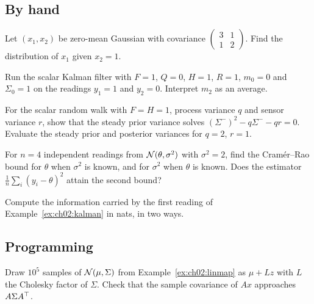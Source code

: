 \subsection*{By hand}

\begin{exercise}\label{exr:ch02:cond}
Let $(x_1,x_2)$ be zero-mean Gaussian with covariance
$\begin{pmatrix}3&1\\1&2\end{pmatrix}$. Find the distribution of $x_1$ given
$x_2=1$.
\end{exercise}

\begin{exercise}\label{exr:ch02:static}
Run the scalar Kalman filter with $F=1$, $Q=0$, $H=1$, $R=1$, $m_0=0$ and
$\Sigma_0=1$ on the readings $y_1=1$ and $y_2=0$. Interpret $m_2$ as an average.
\end{exercise}

\begin{exercise}\label{exr:ch02:steady}
For the scalar random walk with $F=H=1$, process variance $q$ and sensor
variance $r$, show that the steady prior variance solves
$(\Sigma^-)^2-q\Sigma^--qr=0$. Evaluate the steady prior and posterior
variances for $q=2$, $r=1$.
\end{exercise}

\begin{exercise}\label{exr:ch02:crb}
For $n=4$ independent readings from $\mathcal{N}(\theta,\sigma^2)$ with
$\sigma^2=2$, find the Cram\'er--Rao bound for $\theta$ when $\sigma^2$ is
known, and for $\sigma^2$ when $\theta$ is known. Does the estimator
$\tfrac1n\sum_i(y_i-\theta)^2$ attain the second bound?
\end{exercise}

\begin{exercise}\label{exr:ch02:mi}
Compute the information carried by the first reading of Example~\ref{ex:ch02:kalman}
in nats, in two ways.
\end{exercise}

\subsection*{Programming}

\begin{exercise}\label{exr:ch02:sample}
Draw $10^5$ samples of $\mathcal{N}(\mu,\Sigma)$ from Example~\ref{ex:ch02:linmap} as
$\mu+Lz$ with $L$ the Cholesky factor of $\Sigma$. Check that the sample
covariance of $Ax$ approaches $A\Sigma A^{\top}$.
\end{exercise}

